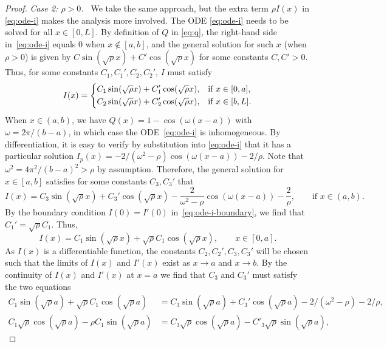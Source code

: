 \documentclass[a4paper, a4wide, 10pt, reqno]{amsart}
\theoremstyle{plain}
\theoremstyle{definition}
\numberwithin{equation}{section}
\begin{document}
\begin{proof}
        \smallskip\noindent 
        \emph{Case 2: $\rho>0$.\ } We take the same approach, but the extra term $\rho I(x)$ in \eqref{eq:ode-i} makes the analysis more involved. 
        The ODE \eqref{eq:ode-i} needs to be solved for all $x\in[0,L]$. By definition of $Q$ in \eqref{eq:q}, the right-hand side in~\eqref{eq:ode-i} equals 0 when $x\notin[a,b]$, and the general solution for such $x$ (when $\rho>0$) is given by $C\sin(\sqrt{\rho}x) + C'\cos(\sqrt{\rho}x)$ for some constants $C, C'>0$. Thus, for some constants $C_1, C_1', C_2, C_2'$, $I$ must satisfy 
        \begin{equation}\label{eq:i-outside}
            I(x) = \begin{dcases}
                C_1\sin(\sqrt{\rho}x) + C_1'\cos(\sqrt{\rho}x),&\text{if } x\in[0, a], \\
                C_{2}\sin(\sqrt{\rho}x) + C_{2}'\cos(\sqrt{\rho}x),&\text{if }x\in[b, L].
            \end{dcases}
        \end{equation}
        When $x\in(a,b)$, we have $Q(x)=1-\cos(\omega(x-a))$ with $\omega=2\pi/(b-a)$, in which case the ODE~\eqref{eq:ode-i} is inhomogeneous. By differentiation, it is easy to verify by substitution into \eqref{eq:ode-i} that it has a particular solution $I_{p}(x) = -2/(\omega^2-\rho)\cos(\omega(x-a)) - 2/\rho$. Note that $\omega^2=4\pi^2/(b-a)^2>\rho$ by assumption. Therefore, the general solution for $x\in[a,b]$ satisfies for some constants $C_{3}, C_{3}'$ that
        \begin{equation}
            I(x) = C_{3}\sin(\sqrt{\rho}x) + C_{3}'\cos(\sqrt{\rho}x) -\frac{2}{\omega^2-\rho}\cos(\omega(x-a)) - \frac{2}{\rho},\qquad\text{if }x\in(a,b).
        \end{equation}By the boundary condition $I(0)=I'(0)$ in~\eqref{eq:ode-i-boundary}, we find that $C_{1}'=\sqrt{\rho}C_{1}$. Thus, 
        \[
        I(x) = C_1\sin(\sqrt{\rho}x) + \sqrt{\rho}C_1\cos(\sqrt{\rho}x), \qquad x\in[0, a].
        \]
        As $I(x)$ is a differentiable function, the constants $C_{2}, C_2', C_3, C_3'$ will be chosen such that the limits of $I(x)$ and $I'(x)$ exist as $x\to a$ and $x\to b$.  By the continuity of $I(x)$ and $I'(x)$ at $x=a$ we find that $C_{3}$ and $C_{3}'$ must satisfy the two equations
        \[
        \begin{aligned}
        C_{1}\sin(\sqrt{\rho}a) + \sqrt{\rho}C_{1}\cos(\sqrt{\rho}a) &= C_{3}\sin(\sqrt{\rho}a) + C_{3}'\cos(\sqrt{\rho}a)-2/(\omega^2-\rho)-2/\rho, \\ C_{1}\sqrt{\rho}\cos(\sqrt{\rho}a)-\rho C_{1}\sin(\sqrt{\rho}a)  &= C_3\sqrt{\rho}\cos(\sqrt{\rho}a) - C'_3\sqrt{\rho}\sin(\sqrt{\rho}a),        \end{aligned}\]

\end{proof}
\end{document}

